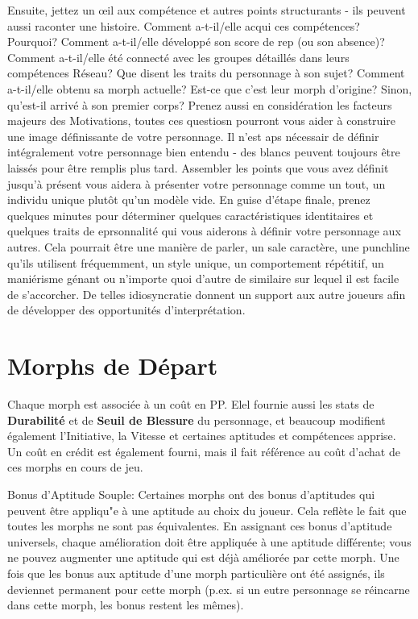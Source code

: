 Ensuite, jettez un œil aux compétence et autres points structurants - ils peuvent aussi raconter une histoire. Comment a-t-il/elle acqui ces compétences? Pourquoi? Comment a-t-il/elle développé son score de rep (ou son absence)? Comment a-t-il/elle été connecté avec les groupes détaillés dans leurs compétences Réseau? Que disent les traits du personnage à son sujet? Comment a-t-il/elle obtenu sa morph actuelle? Est-ce que c'est leur morph d'origine? Sinon, qu'est-il arrivé à son premier corps? Prenez aussi en considération les facteurs majeurs des Motivations, toutes ces questiosn pourront vous aider à construire une image définissante de votre personnage. Il n'est aps nécessair de définir intégralement votre personnage bien entendu - des blancs peuvent toujours être laissés pour être remplis plus tard. Assembler les points que vous avez définit jusqu'à présent vous aidera à présenter votre personnage comme un tout, un individu unique plutôt qu'un modèle vide. En guise d'étape finale, prenez quelques minutes pour déterminer quelques caractéristiques identitaires et quelques traits de eprsonnalité qui vous aiderons à définir votre personnage aux autres. Cela pourrait être une manière de parler, un sale caractère, une punchline qu'ils utilisent fréquemment, un style unique, un comportement répétitif, un maniérisme génant ou n'importe quoi d'autre de similaire sur lequel il est facile de s'accorcher. De telles idiosyncratie donnent un support aux autre joueurs afin de développer des opportunités d'interprétation. 

\section{Morphs de Départ} 

Chaque morph est associée à un coût en PP. Elel fournie aussi les stats de \textbf{Durabilité} et de \textbf{Seuil de Blessure} du personnage, et beaucoup modifient également l'Initiative, la Vitesse et certaines aptitudes et compétences apprise. Un coût en crédit est également fourni, mais il fait référence au coût d'achat de ces morphs en cours de jeu. 

Bonus d'Aptitude Souple: Certaines morphs ont des bonus d'aptitudes qui peuvent être appliqu"e à une aptitude au choix du joueur. Cela reflète le fait que toutes les morphs ne sont pas équivalentes. En assignant ces bonus d'aptitude universels, chaque amélioration doit être appliquée à une aptitude différente; vous ne pouvez augmenter une aptitude qui est déjà améliorée par cette morph. Une fois que les bonus aux aptitude d'une morph particulière ont été assignés, ils deviennet permanent pour cette morph (p.ex. si un eutre personnage se réincarne dans cette morph, les bonus restent les mêmes). 

